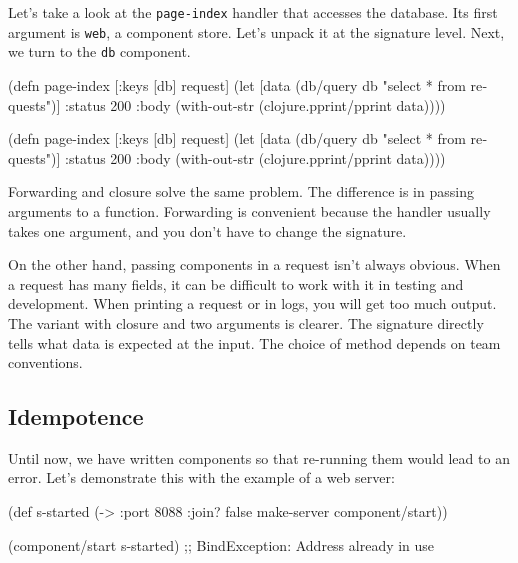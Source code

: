 \fi

Let's take a look at the \verb|page-index| handler that accesses the database. Its first argument is \verb|web|, a component store. Let's unpack it at the signature level. Next, we turn to the \verb|db| component.

\ifnarrow

\begin{english}
  \begin{clojure}
(defn page-index
  [{:keys [db]} request]
  (let [data (db/query db
               "select * from requests")]
    {:status 200
     :body (with-out-str
             (clojure.pprint/pprint
               data))}))
  \end{clojure}
\end{english}

\else

\begin{english}
  \begin{clojure}
(defn page-index
  [{:keys [db]} request]
  (let [data (db/query db "select * from requests")]
    {:status 200
     :body (with-out-str
             (clojure.pprint/pprint data))}))
  \end{clojure}
\end{english}

\fi

Forwarding and closure solve the same problem. The difference is in passing arguments to a function. Forwarding is convenient because the handler usually takes one argument, and you don't have to change the signature.

On the other hand, passing components in a request isn't always obvious. When a request has many fields, it can be difficult to work with it in testing and development. When printing a request or in logs, you will get too much output. The variant with closure and two arguments is clearer. The signature directly tells what data is expected at the input. The choice of method depends on team conventions.

\subsection{Idempotence}

Until now, we have written components so that re-running them would lead to an error. Let's demonstrate this with the example of a web server:

\ifnarrow

\begin{english}
  \begin{clojure}
(def s-started
  (-> {:port 8088 :join? false}
      make-server
      component/start))

(component/start s-started)
;; BindException: Address already in use
  \end{clojure}
\end{english}

